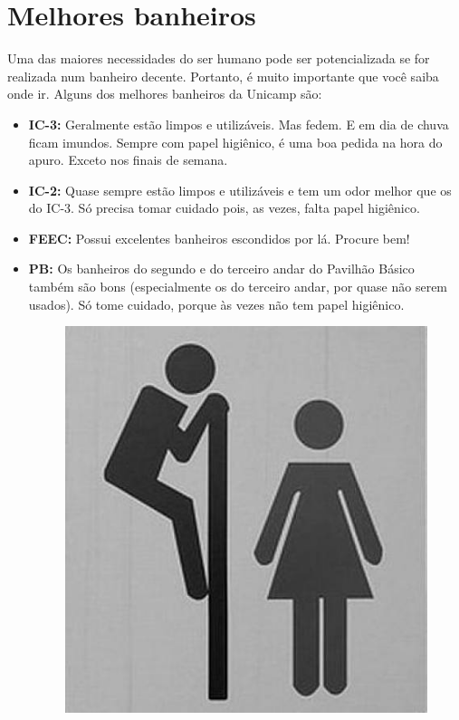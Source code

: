 
\section{Melhores banheiros}

Uma das maiores necessidades do ser humano pode ser potencializada se for
realizada num banheiro decente. Portanto, é muito importante que você saiba onde
ir. Alguns dos melhores banheiros da Unicamp são:

\begin{itemize}
    \item  \textbf{IC-3:} Geralmente estão limpos e utilizáveis. Mas fedem. E em 
        dia de chuva ficam imundos. Sempre com papel higiênico, é uma boa pedida 
        na hora do apuro. Exceto nos finais de semana.

    \item  \textbf{IC-2:} Quase sempre estão limpos e utilizáveis e tem um odor
        melhor que os do IC-3. Só precisa tomar cuidado pois, as vezes, falta
        papel higiênico.

    \item  \textbf{FEEC:} Possui excelentes banheiros escondidos por lá. Procure
        bem!

    \item  \textbf{PB:} Os banheiros do segundo e do terceiro andar do Pavilhão
        Básico também são bons (especialmente os do terceiro andar, por quase
        não serem usados). Só tome cuidado, porque às vezes não tem papel
        higiênico.

        \begin{figure}[h!]
            \centering
            \includegraphics[scale=0.50, keepaspectratio=true]{img/imgs/12-melhores_banheiros/banheiro.jpg}
        \end{figure}


\end{itemize}
